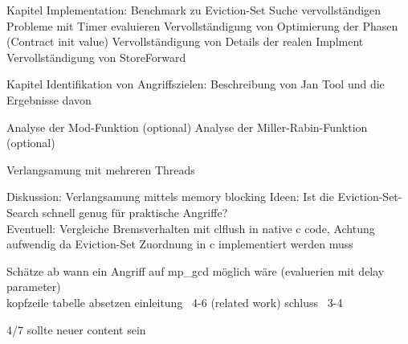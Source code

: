 

Kapitel Implementation:
Benchmark zu Eviction-Set Suche vervollständigen
Probleme mit Timer evaluieren
Vervollständigung von Optimierung der Phasen (Contract init value)
Vervollständigung von Details der realen Implment
Vervollständigung von StoreForward

Kapitel Identifikation von Angriffszielen:
Beschreibung von Jan Tool und die Ergebnisse davon

Analyse der Mod-Funktion (optional)
Analyse der Miller-Rabin-Funktion (optional)

Verlangsamung mit mehreren Threads

Diskussion:
Verlangsamung mittels memory blocking
Ideen: 
Ist die Eviction-Set-Search schnell genug für praktische Angriffe?\\



Eventuell: Vergleiche Bremsverhalten mit clflush in native c code,
Achtung aufwendig da Eviction-Set Zuordnung in c implementiert werden muss

Schätze ab wann ein Angriff auf mp_gcd möglich wäre (evaluerien mit delay parameter)\\




kopfzeile tabelle absetzen
einleitung ~4-6 (related work)
schluss ~3-4

4/7 sollte neuer content sein